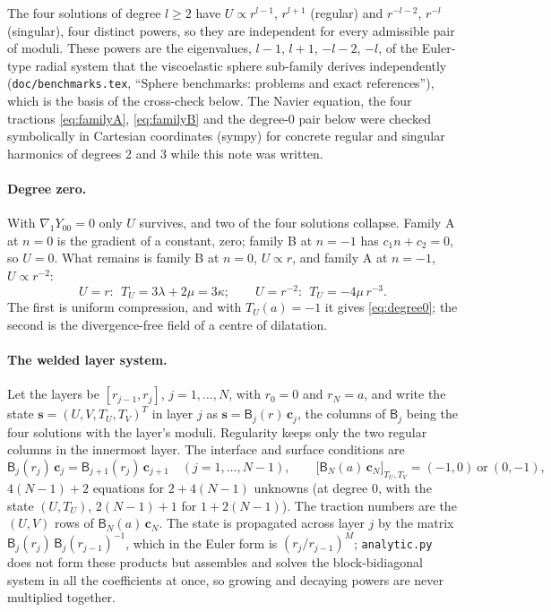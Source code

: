 \documentclass[11pt]{article}
\numberwithin{equation}{section}
\newcommand{\code}[1]{\texttt{#1}}
\newcommand{\gradone}{\nabla_{1}}
\begin{document}
The four solutions of degree $l\ge2$ have $U\propto r^{l-1}$, $r^{l+1}$
(regular) and $r^{-l-2}$, $r^{-l}$ (singular), four distinct powers, so they
are independent for every admissible pair of moduli. These powers are the
eigenvalues, $l-1$, $l+1$, $-l-2$, $-l$, of the Euler-type radial system
that the viscoelastic sphere sub-family derives independently
(\code{doc/benchmarks.tex}, ``Sphere benchmarks: problems and exact
references''), which is the basis of the cross-check below. The Navier
equation, the four tractions \eqref{eq:familyA}, \eqref{eq:familyB} and the
degree-0 pair below were checked symbolically in Cartesian coordinates
(sympy) for concrete regular and singular harmonics of degrees 2 and 3
while this note was written.

\paragraph{Degree zero.} With $\gradone Y_{00}=0$ only $U$ survives, and
two of the four solutions collapse. Family A at $n=0$ is the gradient of a
constant, zero; family B at $n=-1$ has $c_1n+c_2=0$, so $U=0$. What remains
is family B at $n=0$, $U\propto r$, and family A at $n=-1$, $U\propto
r^{-2}$:
\begin{equation}
  U = r:\ \ T_U = 3\lambda+2\mu = 3\kappa;
  \qquad
  U = r^{-2}:\ \ T_U = -4\mu\,r^{-3}.
\end{equation}
The first is uniform compression, and with $T_U(a)=-1$ it gives
\eqref{eq:degree0}; the second is the divergence-free field of a
centre of dilatation.

\paragraph{The welded layer system.} Let the layers be $[r_{j-1},r_j]$,
$j=1,\dots,N$, with $r_0=0$ and $r_N=a$, and write the state
$\mathbf s=(U,V,T_U,T_V)^T$ in layer $j$ as $\mathbf s=\mathsf B_j(r)\,
\mathbf c_j$, the columns of $\mathsf B_j$ being the four solutions with
the layer's moduli. Regularity keeps only the two regular columns in the
innermost layer. The interface and surface conditions are
\begin{equation}
  \mathsf B_j(r_j)\,\mathbf c_j = \mathsf B_{j+1}(r_j)\,\mathbf c_{j+1}
  \quad (j=1,\dots,N-1),
  \qquad
  \bigl[\mathsf B_N(a)\,\mathbf c_N\bigr]_{T_U,T_V} = (-1,0)\ \text{or}\ (0,-1),
\end{equation}
$4(N-1)+2$ equations for $2+4(N-1)$ unknowns (at degree 0, with the state
$(U,T_U)$, $2(N-1)+1$ for $1+2(N-1)$). The traction numbers are the
$(U,V)$ rows of $\mathsf B_N(a)\,\mathbf c_N$. The state is propagated
across layer $j$ by the matrix $\mathsf B_j(r_j)\,\mathsf B_j(r_{j-1})^{-1}$,
which in the Euler form is $(r_j/r_{j-1})^{M}$; \code{analytic.py} does not
form these products but assembles and solves the block-bidiagonal system in
all the coefficients at once, so growing and decaying powers are never
multiplied together.
\end{document}
